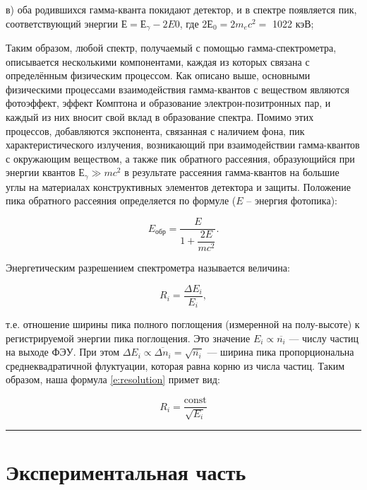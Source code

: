 \documentclass[a4paper,12pt]{article} %
\begin{document}
	в) оба родившихся гамма-кванта покидают детектор, и в спектре появляется пик, соответствующий энергии $Е = Е_\gamma - 2E0$, где $2Е_0 = 2m_ec^2 = $ 1022 кэВ;
	
Таким образом, любой спектр, получаемый с помощью гамма-спектрометра, описывается несколькими компонентами, каждая из которых связана с определённым физическим процессом. Как описано выше, основными физическими процессами взаимодействия гамма-квантов с веществом являются фотоэффект, эффект Комптона и образование электрон-позитронных пар, и каждый из них вносит свой вклад в образование спектра. Помимо этих процессов, добавляются экспонента, связанная с наличием фона, пик характеристического излучения, возникающий при взаимодействии гамма-квантов с окружающим веществом, а также пик обратного рассеяния, образующийся при энергии квантов $ Е_\gamma \gg mc^2 $ в результате рассеяния гамма-квантов на большие углы на материалах конструктивных элементов детектора и защиты. Положение пика обратного рассеяния определяется по формуле ($ E $ -- энергия фотопика):
	
	\begin{equation}
		E_{обр} = \dfrac{E}{1 + \dfrac{2E}{mc^2}}.
		\label{e:compron_back}
	\end{equation}

	
Энергетическим разрешением спектрометра называется величина:
	
	\begin{equation}\label{e:resolution}
	R_i = \dfrac{\Delta E_i}{E_i},
	\end{equation}
	
\noindent т.е. отношение ширины пика полного поглощения (измеренной на полу-высоте) к регистрируемой энергии пика поглощения. Это значение $ E_i \propto \overline{n_i} $ --- числу частиц на выходе ФЭУ. При этом  $ \Delta E_i \propto \overline{\Delta n_i} = \sqrt{\overline{n_i}} $ --- ширина пика пропорциональна среднеквадратичной флуктуации, которая равна корню из числа частиц. Таким образом, наша формула \eqref{e:resolution} примет вид:
	
	\begin{equation}\label{e:res_law}
	R_i = \dfrac{\mathrm{const}}{\sqrt{E_i}}
	\end{equation}

\medskip\hrule\medskip

\section{Экспериментальная часть}
\end{document}
